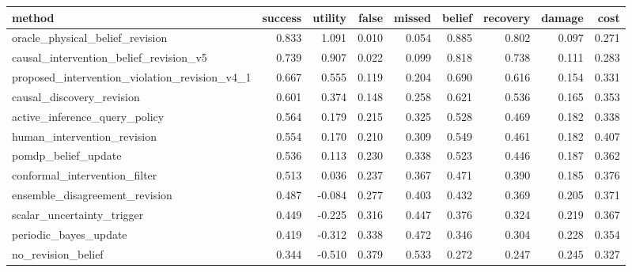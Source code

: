 \begin{tabular}{lrrrrrrrr}
\toprule
method & success & utility & false & missed & belief & recovery & damage & cost \\
\midrule
oracle\_physical\_belief\_revision & 0.833 & 1.091 & 0.010 & 0.054 & 0.885 & 0.802 & 0.097 & 0.271 \\
causal\_intervention\_belief\_revision\_v5 & 0.739 & 0.907 & 0.022 & 0.099 & 0.818 & 0.738 & 0.111 & 0.283 \\
proposed\_intervention\_violation\_revision\_v4\_1 & 0.667 & 0.555 & 0.119 & 0.204 & 0.690 & 0.616 & 0.154 & 0.331 \\
causal\_discovery\_revision & 0.601 & 0.374 & 0.148 & 0.258 & 0.621 & 0.536 & 0.165 & 0.353 \\
active\_inference\_query\_policy & 0.564 & 0.179 & 0.215 & 0.325 & 0.528 & 0.469 & 0.182 & 0.338 \\
human\_intervention\_revision & 0.554 & 0.170 & 0.210 & 0.309 & 0.549 & 0.461 & 0.182 & 0.407 \\
pomdp\_belief\_update & 0.536 & 0.113 & 0.230 & 0.338 & 0.523 & 0.446 & 0.187 & 0.362 \\
conformal\_intervention\_filter & 0.513 & 0.036 & 0.237 & 0.367 & 0.471 & 0.390 & 0.185 & 0.376 \\
ensemble\_disagreement\_revision & 0.487 & -0.084 & 0.277 & 0.403 & 0.432 & 0.369 & 0.205 & 0.371 \\
scalar\_uncertainty\_trigger & 0.449 & -0.225 & 0.316 & 0.447 & 0.376 & 0.324 & 0.219 & 0.367 \\
periodic\_bayes\_update & 0.419 & -0.312 & 0.338 & 0.472 & 0.346 & 0.304 & 0.228 & 0.354 \\
no\_revision\_belief & 0.344 & -0.510 & 0.379 & 0.533 & 0.272 & 0.247 & 0.245 & 0.327 \\
\bottomrule
\end{tabular}
